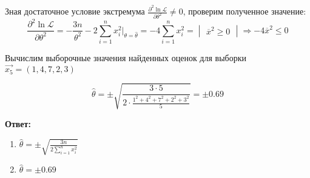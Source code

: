 Зная достаточное условие экстремума $\frac{\partial^2 \ln \mathcal{L}}{\partial \theta^2} \neq 0$, проверим полученное значение:
\begin{equation*}
    \frac{\partial^2 \ln \mathcal{L}}{\partial \theta^2} =
    -\frac{3n}{\theta^2} - 2 \sum\limits_{i=1}^n{x_i^2} \Bigg|_{\theta=\hat{\theta}} =
    -4 \sum\limits_{i=1}^n{x_i^2} =
    \begin{vmatrix}
        \overline{x}^2 \geq 0
    \end{vmatrix}
    \Rightarrow -4 \overline{x}^2 \leq 0
\end{equation*}

Вычислим выборочные значения найденных оценок для выборки\\
$\vec{x_5} = (1, 4, 7, 2, 3)$

\begin{equation*}
    \hat{\theta} = \pm \sqrt{\frac{3 \cdot 5}{2 \cdot \frac{1^2 + 4^2 + 7^2 + 2^2 +3^2}{5}}} = \pm 0.69
\end{equation*}

\textbf{Ответ:} 
\begin{enumerate}
    \item $\hat\theta = \pm \sqrt{\frac{3n}{2 \sum\limits_{i = 1}^n{x_i^2}}}$
    \item $\hat{\theta} = \pm 0.69$

\end{enumerate}
